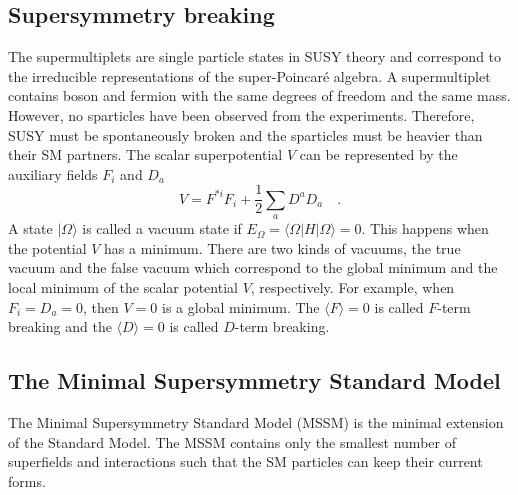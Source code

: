 
\subsection{Supersymmetry breaking}
\label{sybsec:susy_soft_susy_breaking}
The supermultiplets are single particle states in SUSY theory and correspond to the irreducible representations of the super-Poincar\'{e} algebra.
A supermultiplet contains boson and fermion with the same degrees of freedom and the same mass.
However, no sparticles have been observed from the experiments.
Therefore, SUSY must be spontaneously broken and the sparticles must be heavier than their SM partners.
The scalar superpotential $V$ can be represented by the auxiliary fields $F_{i}$ and $D_{a}$
%
\begin{equation}
    V = F^{*i}F_{i} + \frac{1}{2} \sum_{a} D^{a} D_{a} \quad .
    \label{eq:susy_scalar_superpotential}
\end{equation}
%
A state $|\Omega \rangle$ is called a vacuum state if $E_{\Omega} = \langle \Omega | H | \Omega \rangle = 0$.
This happens when the potential $V$ has a minimum.
There are two kinds of vacuums, the true vacuum and the false vacuum which correspond to the global minimum and the local minimum of the scalar potential $V$, respectively.
For example, when $F_{i} = D_{a} = 0$, then $V = 0$ is a global minimum.
The $\langle F \rangle = 0$ is called $F$-term breaking and the $\langle D \rangle = 0$ is called $D$-term breaking.


\subsection{The Minimal Supersymmetry Standard Model}
\label{subsec:susy_mssm}
The Minimal Supersymmetry Standard Model (MSSM) is the minimal extension of the Standard Model.
The MSSM contains only the smallest number of superfields and interactions such that the SM particles can keep their current forms.


